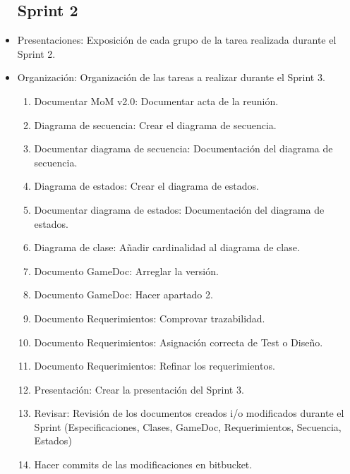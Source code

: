 \begin{itemize}
\subsection{Sprint 2}
\item Presentaciones: Exposición de cada grupo de la tarea realizada durante el Sprint 2.
\item Organización: Organización de las tareas a realizar durante el Sprint 3.
\begin{enumerate}
	\item Documentar MoM v2.0: Documentar acta de la reunión.
	\item Diagrama de secuencia: Crear el diagrama de secuencia.
	\item Documentar diagrama de secuencia: Documentación del diagrama de secuencia.
	\item Diagrama de estados: Crear el diagrama de estados.
	\item Documentar diagrama de estados: Documentación del diagrama de estados.
	\item Diagrama de clase: Añadir cardinalidad al diagrama de clase.
	\item Documento GameDoc: Arreglar la versión.
	\item Documento GameDoc: Hacer apartado 2.
	\item Documento Requerimientos: Comprovar trazabilidad.
	\item Documento Requerimientos: Asignación correcta de Test o Diseño.
	\item Documento Requerimientos: Refinar los requerimientos.
	\item Presentación: Crear la presentación del Sprint 3.
	\item Revisar: Revisión de los documentos creados i/o modificados durante el Sprint (Especificaciones, Clases, GameDoc, Requerimientos, Secuencia, Estados)
	\item Hacer commits de las modificaciones en bitbucket.
\end{enumerate}







\end{itemize}
